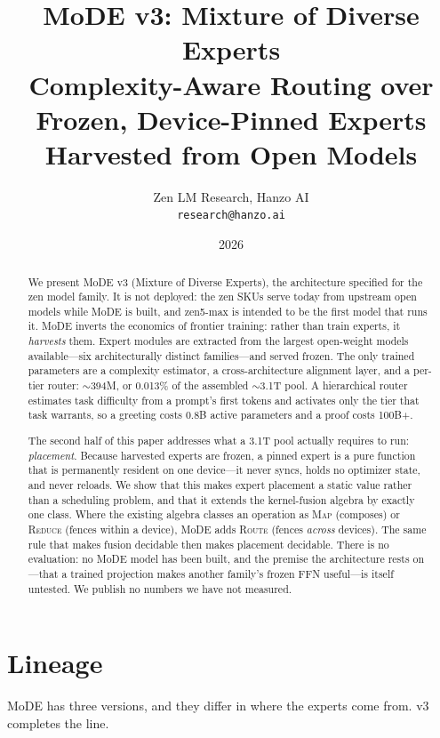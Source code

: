 \documentclass[11pt,a4paper]{article}
\title{\textbf{MoDE v3: Mixture of Diverse Experts}\\
\large Complexity-Aware Routing over Frozen, Device-Pinned Experts\\
Harvested from Open Models}
\author{Zen LM Research, Hanzo AI\\
\texttt{research@hanzo.ai}}
\date{2026}
\begin{document}
\maketitle

\begin{abstract}
We present MoDE v3 (Mixture of Diverse Experts), the architecture specified for the zen
model family. It is not deployed: the zen SKUs serve today from upstream open models while
MoDE is built, and zen5-max is intended to be the first model that runs it. MoDE
inverts the economics of frontier training: rather than train experts, it \emph{harvests}
them. Expert modules are extracted from the largest open-weight models available---six
architecturally distinct families---and served frozen. The only trained parameters are a
complexity estimator, a cross-architecture alignment layer, and a per-tier router:
$\sim$394M, or 0.013\% of the assembled $\sim$3.1T pool. A hierarchical router estimates
task difficulty from a prompt's first tokens and activates only the tier that task
warrants, so a greeting costs 0.8B active parameters and a proof costs 100B+.

The second half of this paper addresses what a 3.1T pool actually requires to run:
\emph{placement}. Because harvested experts are frozen, a pinned expert is a pure
function that is permanently resident on one device---it never syncs, holds no optimizer
state, and never reloads. We show that this makes expert placement a static value rather
than a scheduling problem, and that it extends the kernel-fusion algebra by exactly one
class. Where the existing algebra classes an operation as \textsc{Map} (composes) or
\textsc{Reduce} (fences within a device), MoDE adds \textsc{Route} (fences \emph{across}
devices). The same rule that makes fusion decidable then makes placement decidable.
There is no evaluation: no MoDE model has been built, and the premise the architecture rests
on---that a trained projection makes another family's frozen FFN useful---is itself untested.
We publish no numbers we have not measured.
\end{abstract}

\section*{Lineage}

MoDE has three versions, and they differ in where the experts come from. v3 completes the
line.
\end{document}
